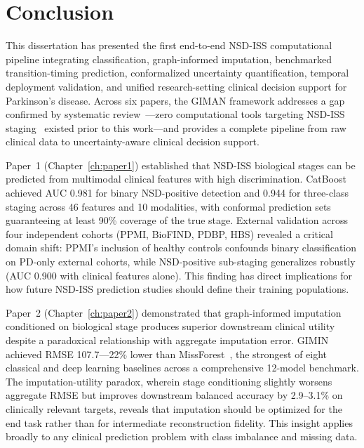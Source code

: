 
\chapter{Conclusion}
\label{ch:conclusion}

This dissertation has presented the first end-to-end NSD-ISS computational pipeline integrating classification, graph-informed imputation, benchmarked transition-timing prediction, conformalized uncertainty quantification, temporal deployment validation, and unified research-setting clinical decision support for Parkinson's disease. Across six papers, the GIMAN framework addresses a gap confirmed by systematic review~\cite{page2021}---zero computational tools targeting NSD-ISS staging~\cite{simuni2024} existed prior to this work---and provides a complete pipeline from raw clinical data to uncertainty-aware clinical decision support.

Paper~1 (Chapter~\ref{ch:paper1}) established that NSD-ISS biological stages can be predicted from multimodal clinical features with high discrimination. CatBoost achieved AUC 0.981 for binary NSD-positive detection and 0.944 for three-class staging across 46 features and 10 modalities, with conformal prediction sets~\cite{vovk2022} guaranteeing at least 90\% coverage of the true stage. External validation across four independent cohorts (PPMI, BioFIND, PDBP, HBS) revealed a critical domain shift: PPMI's inclusion of healthy controls confounds binary classification on PD-only external cohorts, while NSD-positive sub-staging generalizes robustly (AUC 0.900 with clinical features alone). This finding has direct implications for how future NSD-ISS prediction studies should define their training populations.

Paper~2 (Chapter~\ref{ch:paper2}) demonstrated that graph-informed imputation conditioned on biological stage produces superior downstream clinical utility despite a paradoxical relationship with aggregate imputation error. GIMIN achieved RMSE 107.7---22\% lower than MissForest~\cite{stekhoven2012}, the strongest of eight classical and deep learning baselines across a comprehensive 12-model benchmark. The imputation-utility paradox, wherein stage conditioning slightly worsens aggregate RMSE but improves downstream balanced accuracy by 2.9--3.1\% on clinically relevant targets, reveals that imputation should be optimized for the end task rather than for intermediate reconstruction fidelity. This insight applies broadly to any clinical prediction problem with class imbalance and missing data.

